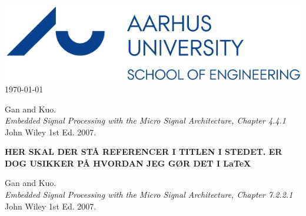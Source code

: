\documentclass[12pt]{article}
\renewcommand{\refname}{whatever}
\begin{document}
\begin{titlepage}
		
		\includegraphics[scale=0.5]{Img/logo.jpg}\\[1cm]
		
		{\large \today}\\[0.5cm] %
		
		
		\vfill %
		
	\end{titlepage}
	
\newpage
\tableofcontents
\newpage
\listoffigures
\newpage

\hypersetup{linkcolor=blue}













\renewcommand\refname{References}
\begin{thebibliography}{9}
	Gan and Kuo. \\
	\textit{Embedded Signal Processing with the Micro Signal Architecture, Chapter 4.4.1}\\ 
	John Wiley 1st Ed. 2007.
	
	\textbf{HER SKAL DER STÅ REFERENCER I TITLEN I STEDET. ER DOG USIKKER PÅ HVORDAN JEG GØR DET I LaTeX}
	
	Gan and Kuo. \\
	\textit{Embedded Signal Processing with the Micro Signal Architecture, Chapter 7.2.2.1}\\ 
	John Wiley 1st Ed. 2007.
	
\end{thebibliography}






\end{document}
